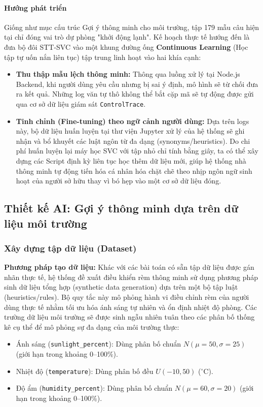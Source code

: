 \paragraph{Hướng phát triển}
Giống như mục cấu trúc Gợi ý thông minh cho môi trường, tập 179 mẫu câu hiện tại chỉ đóng vai trò dự phòng "khởi động lạnh". Kế hoạch thực tế hướng đến là đưa bộ đôi STT-SVC vào một khung đường ống \textbf{Continuous Learning} (Học tập tự uốn nắn liên tục) tập trung linh hoạt vào hai khía cạnh:
\begin{itemize}
    \item \textbf{Thu thập mẫu lệch thông minh:} Thông qua luồng xử lý tại Node.js Backend, khi người dùng yêu cầu nhưng bị sai ý định, mô hình sẽ từ chối đưa ra kết quả. Những log văn tự thô không thể bắt cặp mã sẽ tự động được gửi qua cơ sở dữ liệu giám sát \texttt{ControlTrace}.
    \item \textbf{Tinh chỉnh (Fine-tuning) theo ngữ cảnh người dùng:} Dựa trên logs này, bộ dữ liệu huấn luyện tại thư viện Jupyter xử lý của hệ thống sẽ ghi nhận và bổ khuyết các luật ngôn từ đa dạng (synonyms/heuristics). Do chi phí huấn luyện lại máy học SVC với tập nhỏ chỉ tính bằng giây, ta có thể xây dựng các Script định kỳ liên tục học thêm dữ liệu mới, giúp hệ thống nhà thông minh tự động tiến hóa cá nhân hóa chặt chẽ theo nhịp ngôn ngữ sinh hoạt của người sở hữu thay vì bó hẹp vào một cơ sở dữ liệu đóng.
\end{itemize}

\subsection{Thiết kế AI: Gợi ý thông minh dựa trên dữ liệu môi trường}

\subsubsection{Xây dựng tập dữ liệu (Dataset)}
\textbf{Phương pháp tạo dữ liệu:}
Khác với các bài toán có sẵn tập dữ liệu được gán nhãn thực tế, hệ thống đề xuất điều khiển rèm thông minh sử dụng phương pháp sinh dữ liệu tổng hợp (synthetic data generation) dựa trên một bộ tập luật (heuristics/rules). Bộ quy tắc này mô phỏng hành vi điều chỉnh rèm của người dùng thực tế nhằm tối ưu hóa ánh sáng tự nhiên và ổn định nhiệt độ phòng. Các trường dữ liệu môi trường sẽ được sinh ngẫu nhiên tuân theo các phân bố thống kê cụ thể để mô phỏng sự đa dạng của môi trường thực:
\begin{itemize}
    \item Ánh sáng (\texttt{sunlight\_percent}): Dùng phân bố chuẩn $N(\mu=50, \sigma=25)$ (giới hạn trong khoảng 0--100\%).
    \item Nhiệt độ (\texttt{temperature}): Dùng phân bố đều $U(-10, 50)$ ($^\circ$C).
    \item Độ ẩm (\texttt{humidity\_percent}): Dùng phân bố chuẩn $N(\mu=60, \sigma=20)$ (giới hạn trong khoảng 0--100\%).
\end{itemize}

